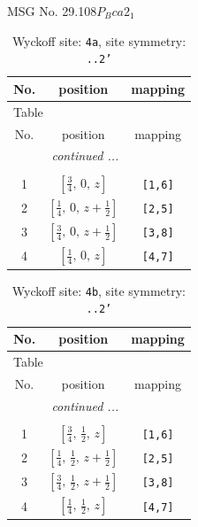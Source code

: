 \documentclass[fleqn,8pt]{jsarticle}
\begin{document}
\setcounter{MaxMatrixCols}{32}

\renewcommand{\tablename}{Table~}
\renewcommand{\figurename}{Figure~}
\begin{center}
\LARGE
MSG No. 29.108\quad$P_{B}ca2_{1}$
\end{center}
\renewcommand{\arraystretch}{1.2}
\begin{longtable}{ccc}
\caption{Wyckoff site: {\tt 4a}, site symmetry: {\tt ..2'}}
 \\
 \hline \hline
No. & position & mapping \\ \hline \endfirsthead

\multicolumn{2}{l}{\tablename\ \thetable{}} \\
 \hline \hline
No. & position & mapping \\ \hline \endhead

 \hline \hline
\multicolumn{2}{r}{\footnotesize\it continued ...} \\ \endfoot

 \hline \hline
\multicolumn{2}{r}{} \\ \endlastfoot

1 & $\left[ \frac{3}{4},\, 0,\, z \right]$ & {\tt [1,6]} \\ \hline
2 & $\left[ \frac{1}{4},\, 0,\, z + \frac{1}{2} \right]$ & {\tt [2,5]} \\ \hline
3 & $\left[ \frac{3}{4},\, 0,\, z + \frac{1}{2} \right]$ & {\tt [3,8]} \\ \hline
4 & $\left[ \frac{1}{4},\, 0,\, z \right]$ & {\tt [4,7]} \\
\end{longtable}
\renewcommand{\arraystretch}{1.2}
\begin{longtable}{ccc}
\caption{Wyckoff site: {\tt 4b}, site symmetry: {\tt ..2'}}
 \\
 \hline \hline
No. & position & mapping \\ \hline \endfirsthead

\multicolumn{2}{l}{\tablename\ \thetable{}} \\
 \hline \hline
No. & position & mapping \\ \hline \endhead

 \hline \hline
\multicolumn{2}{r}{\footnotesize\it continued ...} \\ \endfoot

 \hline \hline
\multicolumn{2}{r}{} \\ \endlastfoot

1 & $\left[ \frac{3}{4},\, \frac{1}{2},\, z \right]$ & {\tt [1,6]} \\ \hline
2 & $\left[ \frac{1}{4},\, \frac{1}{2},\, z + \frac{1}{2} \right]$ & {\tt [2,5]} \\ \hline
3 & $\left[ \frac{3}{4},\, \frac{1}{2},\, z + \frac{1}{2} \right]$ & {\tt [3,8]} \\ \hline
4 & $\left[ \frac{1}{4},\, \frac{1}{2},\, z \right]$ & {\tt [4,7]} \\
\end{longtable}
\end{document}
